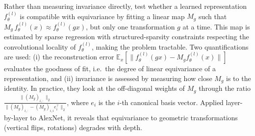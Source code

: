 \documentclass[mathematics,review,submit,moreauthors]{Definitions/mdpi}
\begin{document}
Rather than measuring invariance directly, \citet{lenc2014a} test whether a learned representation $f_\theta^{(l)}$ is compatible with equivariance by fitting a linear map $M_g$ such that $M_g\,f_\theta^{(l)}(x) \approx f_\theta^{(l)}(gx)$, but only one transformation $g$ at a time.
This map is estimated by sparse regression with structured-sparsity constraints respecting the convolutional locality of $f_\theta^{(l)}$, making the problem tractable.
Two quantifications are used: (i) the reconstruction error $\mathbb{E}_x[\|f_\theta^{(l)}(gx)-M_g f_\theta^{(l)}(x)\|]$ evaluates the goodness of fit, i.e.\ the degree of linear equivariance of a representation, and (ii) invariance is assessed by measuring how close $M_g$ is to the identity.
In practice, they look at the off-diagonal weights of $M_g$ through the ratio $\frac{\|(M_g)_{i,:}\|_2}{\|(M_g)_{i,:}-(M_g)_{i,i}e_{i}^\top\|_2}$, where $e_{i}$ is the $i$-th canonical basis vector.
Applied layer-by-layer to AlexNet, it reveals that equivariance to geometric transformations (vertical flips, rotations) degrades with depth.
\end{document}
